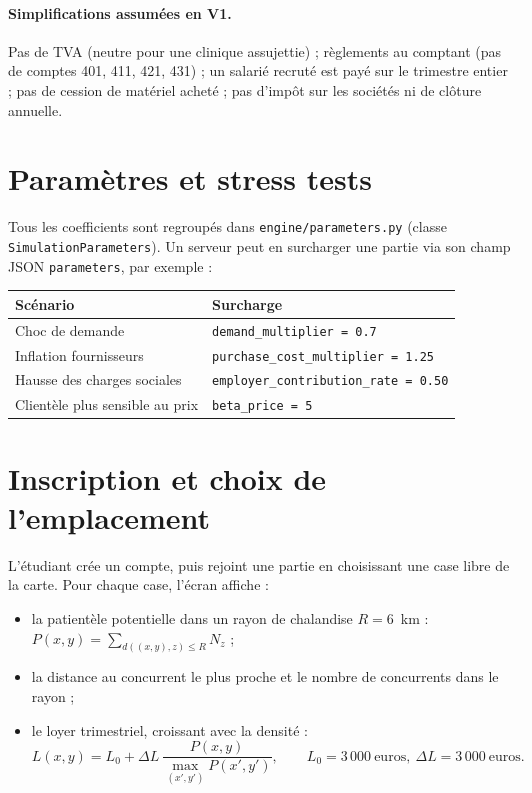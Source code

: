 \documentclass[11pt,a4paper]{article}
\newcommand{\code}[1]{\texttt{#1}}
\begin{document}
\paragraph{Simplifications assumées en V1.} Pas de TVA (neutre pour une
clinique assujettie) ; règlements au comptant (pas de comptes 401, 411, 421,
431) ; un salarié recruté est payé sur le trimestre entier ; pas de cession
de matériel acheté ; pas d'impôt sur les sociétés ni de clôture annuelle.

\section{Paramètres et stress tests}

Tous les coefficients sont regroupés dans \code{engine/parameters.py}
(classe \code{SimulationParameters}). Un serveur peut en surcharger une
partie via son champ JSON \code{parameters}, par exemple :

\begin{center}
\begin{tabular}{@{}ll@{}}
\toprule
Scénario & Surcharge \\
\midrule
Choc de demande & \code{demand\_multiplier = 0.7} \\
Inflation fournisseurs & \code{purchase\_cost\_multiplier = 1.25} \\
Hausse des charges sociales & \code{employer\_contribution\_rate = 0.50} \\
Clientèle plus sensible au prix & \code{beta\_price = 5} \\
\bottomrule
\end{tabular}
\end{center}

\section{Inscription et choix de l'emplacement}

L'étudiant crée un compte, puis rejoint une partie en choisissant une case
libre de la carte. Pour chaque case, l'écran affiche :

\begin{itemize}
  \item la patientèle potentielle dans un rayon de chalandise
    $R = 6$~km : $P(x,y) = \sum_{d((x,y),z) \le R} N_z$ ;
  \item la distance au concurrent le plus proche et le nombre de concurrents
    dans le rayon ;
  \item le loyer trimestriel, croissant avec la densité :
    \[
      L(x,y) = L_0 + \Delta L \,\frac{P(x,y)}{\max_{(x',y')} P(x',y')},
      \qquad L_0 = 3\,000~\text{euros},\ \Delta L = 3\,000~\text{euros}.
    \]
\end{itemize}
\end{document}
